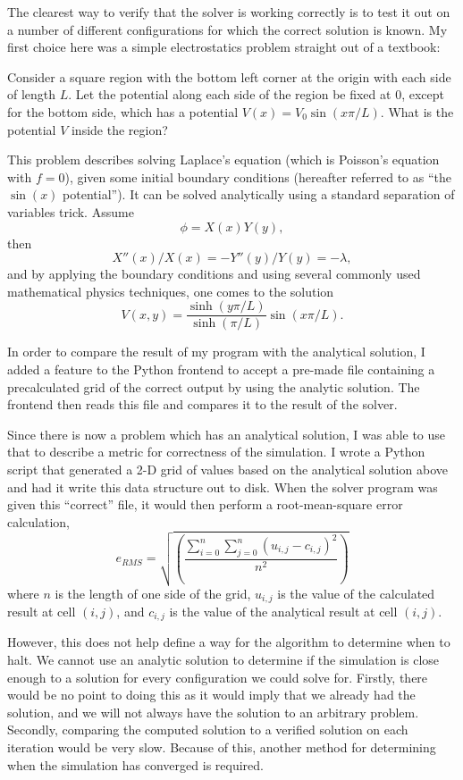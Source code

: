 The clearest way to verify that the solver is working correctly is to test it out on a number of different configurations
for which the correct solution is known. My first choice here was a simple electrostatics problem straight out of a textbook\cite{griffiths}:
\begin{addmargin}[2em]{2em}%
	Consider a square region with the bottom left corner at the origin with each side of length $L$. Let the potential
	along each side of the region be fixed at 0, except for the bottom side, which has a potential $V(x) = V_0 \sin(x \pi / L)$.
	What is the potential $V$ inside the region?
\end{addmargin}
This problem describes solving Laplace's equation (which is Poisson's equation with $f=0$), given some initial boundary conditions (hereafter referred to as ``the $\sin(x)$ potential'').
It can be solved analytically using a standard separation of variables trick\cite{boas}. Assume
$$\phi = X(x) Y(y),$$
then
$$X''(x)/X(x) = -Y''(y)/Y(y) = -\lambda,$$
and by applying the boundary conditions and using several commonly used mathematical physics techniques, one comes to the solution\cite{griffiths}
$$V(x,y) = \frac{\sinh(y \pi / L)}{\sinh(\pi / L)} \sin(x \pi / L).$$

In order to compare the result of my program with the analytical solution, I added a feature to the Python frontend
to accept a pre-made file containing a precalculated grid of the correct output by using the analytic solution. The
frontend then reads this file and compares it to the result of the solver.

Since there is now a problem which has an analytical solution, I was able to use that to describe a metric for
correctness of the simulation. I wrote a Python script that generated a 2-D grid of values based on the analytical
solution above and had it write this data structure out to disk. When the solver program was given this ``correct''
file, it would then perform a root-mean-square error calculation,
$$e_{RMS} = \sqrt{\left(\frac{\sum_{i=0}^{n} \sum_{j=0}^{n} (u_{i,j} - c_{i,j})^2}{n^2}\right)}$$
where $n$ is the length of one side of the grid, $u_{i,j}$ is the value of the calculated result at cell $(i,j)$, and
$c_{i, j}$ is the value of the analytical result at cell $(i, j)$.



However, this does not help define a way for the algorithm to determine when to halt. We cannot use an analytic solution
to determine if the simulation is close enough to a solution for every configuration we could solve for. Firstly, there
would be no point to doing this as it would imply that we already had the solution, and we will not always have the
solution to an arbitrary problem. Secondly, comparing the computed solution to a verified solution on each iteration would
be very slow. Because of this, another method for determining when the simulation has converged is required.

